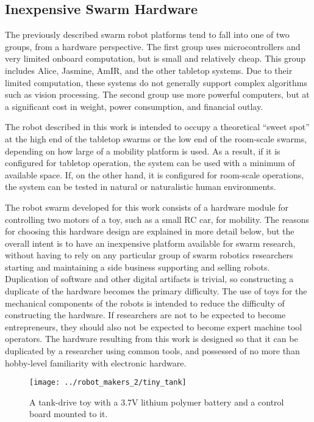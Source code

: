 \documentclass[]{article}
\begin{document}
\subsection{Inexpensive Swarm Hardware}

The previously described swarm robot platforms tend to fall into one of two groups, from a hardware perspective. 
The first group uses microcontrollers and very limited onboard computation, but is small and relatively cheap.
This group includes Alice, Jasmine, AmIR, and the other tabletop systems. 
Due to their limited computation, these systems do not generally support complex algorithms such as vision processing. 
The second group use more powerful computers, but at a significant cost in weight, power consumption, and financial outlay.

The robot described in this work is intended to occupy a theoretical ``sweet spot'' at the high end of the tabletop swarms or the low end of the room-scale swarms, depending on how large of a mobility platform is used. 
As a result, if it is configured for tabletop operation, the system can be used with a minimum of available space. 
If, on the other hand, it is configured for room-scale operations, the system can be tested in natural or naturalistic human environments. 

The robot swarm developed for this work consists of a hardware module for controlling two motors of a toy, such as a small RC car, for mobility. 
The reasons for choosing this hardware design are explained in more detail below, but the overall intent is to have an inexpensive platform available for swarm research, without having to rely on any particular group of swarm robotics researchers starting and maintaining a side business supporting and selling robots.
Duplication of software and other digital artifacts is trivial, so constructing a duplicate of the hardware becomes the primary difficulty. 
The use of toys for the mechanical components of the robots is intended to reduce the difficulty of constructing the hardware. 
If researchers are not to be expected to become entrepreneurs, they should also not be expected to become expert machine tool operators.
The hardware resulting from this work is designed so that it can be duplicated by a researcher using common tools, and possessed of no more than hobby-level familiarity with electronic hardware.

\begin{figure}
\centering
\texttt{[image: ../robot\_makers\_2/tiny\_tank]}
\caption{A tank-drive toy with a 3.7V lithium polymer battery and a control board mounted to it.}
\end{figure}
\end{document}
